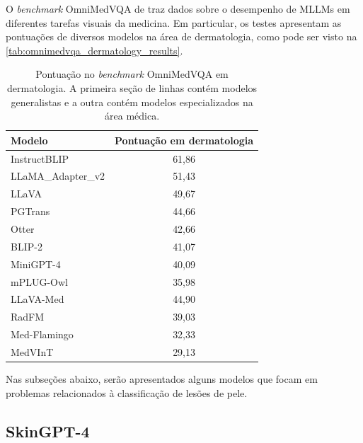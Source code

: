 O \textit{benchmark} OmniMedVQA de \textcite{hu2024omnimedvqa} traz dados sobre o desempenho de \acp{MLLM} em diferentes tarefas visuais da medicina. Em particular, os
testes apresentam as pontuações de diversos modelos na área de dermatologia, como pode ser visto na \autoref{tab:omnimedvqa_dermatology_results}.

\begin{table}[ht]
    \caption{\small Pontuação no \textit{benchmark} OmniMedVQA em dermatologia. A primeira seção de linhas contém modelos generalistas e a outra contém modelos
        especializados na área médica.}
    \centering
    \begin{tabular}{l|c}
        \hline
        Modelo                  & Pontuação em dermatologia \\ \hline
        InstructBLIP            & 61,86                     \\
        \ac{LLaMA}\_Adapter\_v2 & 51,43                     \\
        \ac{LLaVA}              & 49,67                     \\
        PGTrans                 & 44,66                     \\
        Otter                   & 42,66                     \\
        BLIP-2                  & 41,07                     \\
        Mini\ac{GPT}-4          & 40,09                     \\
        mPLUG-Owl               & 35,98                     \\ \hline
        \ac{LLaVA}-Med          & 44,90                     \\
        RadFM                   & 39,03                     \\
        Med-Flamingo            & 32,33                     \\
        MedVInT                 & 29,13                     \\ \hline
    \end{tabular}
    \label{tab:omnimedvqa_dermatology_results}
\end{table}

Nas subseções abaixo, serão apresentados alguns modelos que focam em problemas relacionados à classificação de lesões de pele.

\subsection{SkinGPT-4}

